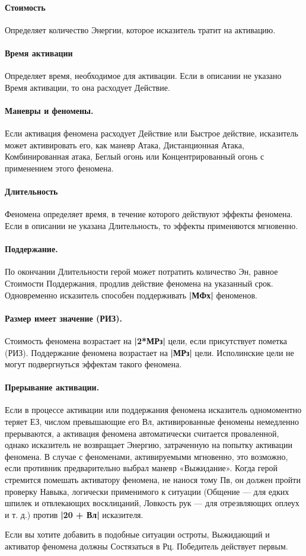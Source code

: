 \paragraph{Стоимость} Определяет количество Энергии, которое исказитель тратит на активацию.
\paragraph{Время активации} Определяет время, необходимое для активации. Если в описании не указано Время активации, то она расходует Действие.
\paragraph{Маневры и феномены.} Если активация феномена расходует Действие или Быстрое действие, исказитель может активировать его, как маневр Атака, Дистанционная Атака, Комбинированная атака, Беглый огонь или Концентрированный огонь с применением этого феномена. 
\paragraph{Длительность} Феномена определяет время, в течение которого действуют эффекты феномена. Если в описании не указана Длительность, то эффекты применяются мгновенно.
\paragraph{Поддержание.} По окончании Длительности герой может потратить количество Эн, равное Стоимости Поддержания, продлив действие феномена на указанный срок.
\newline Одновременно исказитель способен поддерживать \textbf{|МФх|} феноменов.
\paragraph{Размер имеет значение (РИЗ).} Стоимость феномена возрастает на \textbf{|2*МРз|} цели, если присутствует пометка (РИЗ). Поддержание феномена возрастает на \textbf{|МРз|} цели. Исполинские цели не могут подвергнуться эффектам такого феномена. 
\paragraph{Прерывание активации.} Если в процессе активации или поддержания феномена исказитель одномоментно теряет ЕЗ, числом превышающие его Вл, активированные феномены немедленно прерываются, а активация феномена автоматически считается проваленной, однако исказитель не возвращает Энергию, затраченную на попытку активации феномена. В случае с феноменами, активируемыми мгновенно, это возможно, если противник предварительно выбрал маневр «Выжидание». 
\newline Когда герой стремится помешать активатору феномена, не нанося тому Пв, он должен пройти проверку Навыка, логически применимого к ситуации (Общение — для едких шпилек и отвлекающих восклицаний, Ловкость рук — для отрезвляющих оплеух и т. д.) против \textbf{|20 + Вл|} исказителя.
\begin{tcolorbox}
  Если вы хотите добавить в подобные ситуации остроты, Выжидающий и активатор феномена должны Состязаться в Рц. Победитель действует первым. 
\end{tcolorbox}
